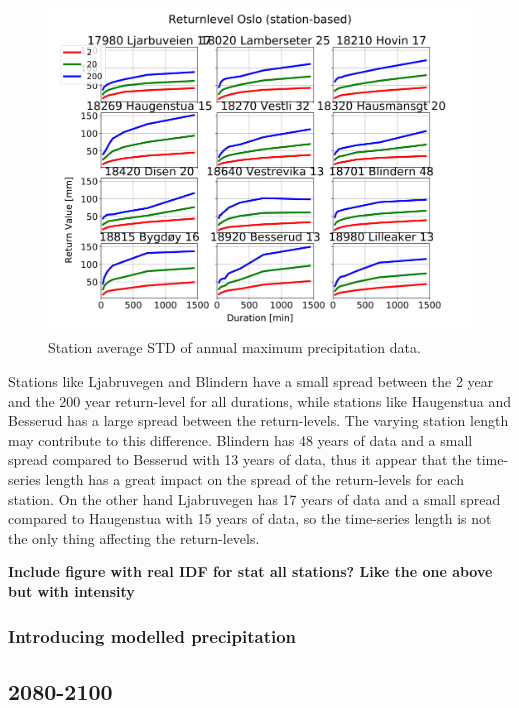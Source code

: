\begin{figure}[hbt!]
    \centering
    \includegraphics[scale=0.3]{figures/IDF_stat_retper.png}
    \caption{Station average STD of annual maximum precipitation data.}
    \label{fig:IDF_stat_retper}
\end{figure}

Stations like Ljabruvegen and Blindern have a small spread between the 2 year and the 200 year return-level for all durations, while stations like Haugenstua and Besserud has a large spread between the return-levels. The varying station length may contribute to this difference. Blindern has 48 years of data and a small spread compared to Besserud with 13 years of data, thus it appear that the time-series length has a great impact on the spread of the return-levels for each station. On the other hand Ljabruvegen has 17 years of data and a small spread compared to Haugenstua with 15 years of data, so the time-series length is not the only thing affecting the return-levels.   

\textbf{Include figure with real IDF for stat all stations? Like the one above but with intensity} 

\subsubsection{Introducing modelled precipitation}


\subsection{2080-2100}
